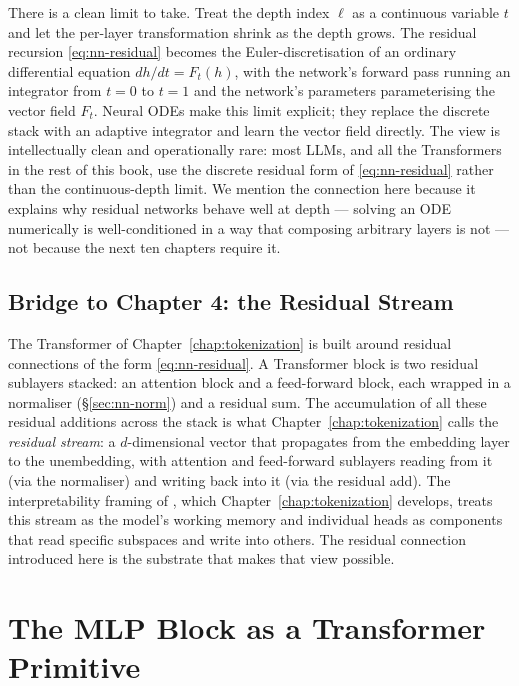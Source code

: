 There is a clean limit to take. Treat the depth index $\ell$ as a
continuous variable $t$ and let the per-layer transformation
shrink as the depth grows. The residual recursion
\eqref{eq:nn-residual} becomes the Euler-discretisation of an
ordinary differential equation $dh/dt = F_t(h)$, with the
network's forward pass running an integrator from $t = 0$ to
$t = 1$ and the network's parameters parameterising the vector
field $F_t$. Neural ODEs \citep{chen2018neuralode} make this
limit explicit; they replace the discrete stack with an adaptive
integrator and learn the vector field directly. The view is
intellectually clean and operationally rare: most LLMs, and all
the Transformers in the rest of this book, use the discrete
residual form of \eqref{eq:nn-residual} rather than the
continuous-depth limit. We mention the connection here because
it explains why residual networks behave well at depth ---
solving an ODE numerically is well-conditioned in a way that
composing arbitrary layers is not --- not because the next ten
chapters require it.

\subsection{Bridge to Chapter 4: the Residual Stream}

The Transformer of Chapter~\ref{chap:tokenization} is built around residual connections
of the form \eqref{eq:nn-residual}. A Transformer block is two
residual sublayers stacked: an attention block and a feed-forward
block, each wrapped in a normaliser (\S\ref{sec:nn-norm}) and a
residual sum. The accumulation of all these residual additions
across the stack is what Chapter~\ref{chap:tokenization} calls the \emph{residual
stream}: a $d$-dimensional vector that propagates from the
embedding layer to the unembedding, with attention and feed-forward
sublayers reading from it (via the normaliser) and writing back
into it (via the residual add). The interpretability framing of
\citet{elhage2021mathematical}, which Chapter~\ref{chap:tokenization} develops, treats
this stream as the model's working memory and individual heads
as components that read specific subspaces and write into others.
The residual connection introduced here is the substrate that
makes that view possible.


\section{The MLP Block as a Transformer Primitive}
\label{sec:nn-mlp-block}

